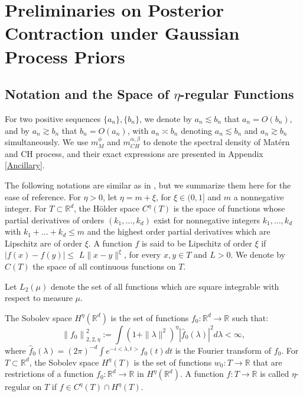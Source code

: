 \documentclass[ejs,noshowframe]{imsart}
\theoremstyle{plain}
\theoremstyle{definition}
\theoremstyle{remark}
\begin{document}
\section{Preliminaries on Posterior Contraction under Gaussian Process Priors} \label{section2}
\subsection{Notation and the   Space of $\eta$-regular Functions} \label{section2.1}
For two positive sequences $\{a_n\}, \{b_n\}$, we denote by $a_n \lesssim b_n$ that $a_n=O(b_n)$, and by $a_n \gtrsim b_n$ that $b_n=O(a_n)$, with $a_n \asymp b_n$ denoting $a_n \lesssim b_n$ and $a_n \gtrsim b_n$ simultaneously. We use $m_M^\phi$ and $m_{CH}^{\alpha,\beta}$ to denote  the spectral density of Mat\'ern  and CH process, and their exact expressions are presented in Appendix \ref{Ancillary}.

The following notations are similar as in \citet{van2011information}, but we summarize them here for the ease of  reference. For $\eta>0$, let $\eta=m+\xi$, for $\xi \in(0,1]$ and $m$ a nonnegative integer. For  $T \subset \mathbb{R}^d$, the H\"older space $C^\eta(T)$ is the space of functions whose partial derivatives of orders $\left(k_1, \ldots, k_d\right)$ exist for nonnegative integers $k_1, \ldots, k_d$ with $k_1+\ldots+k_d \leq m$ and the highest order partial derivatives which  are Lipschitz  are of order $\xi$. A function $f$ is said to be  Lipschitz of order $\xi$ if $|f(x)-f(y)| \leq$ $L\|x-y\|^\xi$, for every $x, y \in T$ and $ L>0$. We denote by $C(T)$  the space of all continuous functions on $T$. 

Let $L_2(\mu)$ denote the set of all functions which are square integrable with respect to measure $\mu$.

The Sobolev space $H^\eta(\mathbb{R}^d)$ is the set of functions 
$f_0:\mathbb{R}^d \rightarrow \mathbb{R}$ such that: 
$$
\left\|f_0\right\|_{2,2,\eta}^2:=\int\left(1+\|\lambda\|^2\right)^\eta\left|\hat{f}_0(\lambda)\right|^2 d \lambda<\infty,
$$
where $\hat{f}_0(\lambda)=(2 \pi)^{-d} \int e^{-i <\lambda,t>} f_0(t) dt$ 
is the Fourier transform of $f_0$. For $T \subset \mathbb{R}^d$, the Sobolev space $H^\eta(T)$  is the set of functions  $w_0:T \rightarrow \mathbb{R}$ that are restrictions of a function $f_0: \mathbb{R}^d \rightarrow \mathbb{R}$ in $H^\eta(\mathbb{R}^d)$. A function $f: T \rightarrow \mathbb{R}$ is called $\eta$-regular on $T$ if $f \in C^\eta(T) {\cap} H^\eta(T)$.
\end{document}
